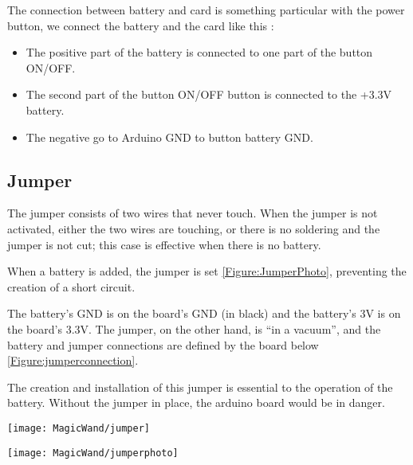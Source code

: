 The connection between battery and card is something particular with the power button, we connect the battery and the card like this :  

\begin{itemize}
    \item The positive part of the battery is connected to one part of the button ON/OFF.
    \item The second part of the button ON/OFF button is connected to the +3.3V battery. 
    \item The negative go to Arduino GND to button battery GND. 
\end{itemize}


\subsection{Jumper}

The jumper consists of two wires that never touch. When the jumper is not activated, either the two wires are touching, or there is no soldering and the jumper is not cut; this case is effective when there is no battery. 

When a battery is added, the jumper is set \ref{Figure:JumperPhoto}, preventing the creation of a short circuit.

The battery's GND is on the board's GND (in black) and the battery's 3V is on the board's 3.3V. The jumper, on the other hand, is ``in a vacuum'', and the battery and jumper connections are defined by the board below \ref{Figure:jumperconnection}. 

The creation and installation of this jumper is essential to the operation of the battery. Without the jumper in place, the arduino board would be in danger. 



\begin{center}
    \texttt{[image: MagicWand/jumper]}
    \label{Figure:jumperconnection}
    

    \bigskip
    
    \texttt{[image: MagicWand/jumperphoto]}
    \label{Figure:JumperPhoto}
\end{center} 




